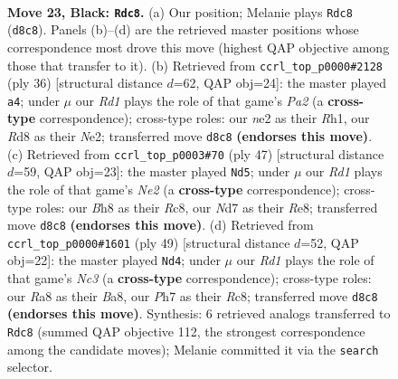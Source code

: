 \documentclass[11pt]{article}
\begin{document}
\clearpage

\begin{figure}[p]\centering
\begin{subfigure}{0.46\textwidth}\centering
\resizebox{\linewidth}{!}{%
\newchessgame
\chessboard[
  setfen={r2r1knb/p2n1p1p/P1p3p1/2P1p1B1/4P2P/5P2/4N1B1/R4RK1 b - - 2 23},
  showmover=false,
  pgfstyle=straightmove, color=movearrow, markmove={d8-c8}
]}
\caption{}
\end{subfigure}\hfill
\begin{subfigure}{0.46\textwidth}\centering
\resizebox{\linewidth}{!}{%
\newchessgame
\chessboard[
  setfen={2kr3r/2p2p1p/pp1b1p2/8/2b1P1PP/2P1BP2/P3NK2/R6R w - - 1 19},
  showmover=false,
  pgfstyle=straightmove, color=movearrow, markmove={a2-a4}
]}
\caption{}
\end{subfigure}
\\[4pt]
\begin{subfigure}{0.46\textwidth}\centering
\resizebox{\linewidth}{!}{%
\newchessgame
\chessboard[
  setfen={2r1r1k1/1pp1npp1/4p2p/pPB5/2R2P2/P3P3/6PP/2R3K1 b - - 4 24},
  showmover=false,
  pgfstyle=straightmove, color=movearrow, markmove={e7-d5}
]}
\caption{}
\end{subfigure}\hfill
\begin{subfigure}{0.46\textwidth}\centering
\resizebox{\linewidth}{!}{%
\newchessgame
\chessboard[
  setfen={b1r1r1k1/5ppp/1pn5/p1b2PPP/5B2/P1N2BK1/1P6/R6R b - - 8 25},
  showmover=false,
  pgfstyle=straightmove, color=movearrow, markmove={c6-d4}
]}
\caption{}
\end{subfigure}
\caption{\textbf{Move 23, Black: \texttt{Rdc8}.} (a) Our position; Melanie plays \texttt{Rdc8} (\texttt{d8c8}). Panels (b)--(d) are the retrieved master positions whose correspondence most drove this move (highest QAP objective among those that transfer to it). (b) Retrieved from \texttt{ccrl\_top\_p0000\#2128} (ply 36) [structural distance $d$=62, QAP obj=24]: the master played \texttt{a4}; under $\mu$ our \emph{Rd1} plays the role of that game's \emph{Pa2} (a \textbf{cross-type} correspondence); cross-type roles: our \emph{n}e2 as their \emph{R}h1, our \emph{R}d8 as their \emph{N}e2; transferred move \texttt{d8c8} \textbf{(endorses this move)}. (c) Retrieved from \texttt{ccrl\_top\_p0003\#70} (ply 47) [structural distance $d$=59, QAP obj=23]: the master played \texttt{Nd5}; under $\mu$ our \emph{Rd1} plays the role of that game's \emph{Ne2} (a \textbf{cross-type} correspondence); cross-type roles: our \emph{B}h8 as their \emph{R}c8, our \emph{N}d7 as their \emph{R}e8; transferred move \texttt{d8c8} \textbf{(endorses this move)}. (d) Retrieved from \texttt{ccrl\_top\_p0000\#1601} (ply 49) [structural distance $d$=52, QAP obj=22]: the master played \texttt{Nd4}; under $\mu$ our \emph{Rd1} plays the role of that game's \emph{Nc3} (a \textbf{cross-type} correspondence); cross-type roles: our \emph{R}a8 as their \emph{B}a8, our \emph{P}h7 as their \emph{R}c8; transferred move \texttt{d8c8} \textbf{(endorses this move)}. Synthesis: 6 retrieved analogs transferred to \texttt{Rdc8} (summed QAP objective 112, the strongest correspondence among the candidate moves); Melanie committed it via the \texttt{search} selector.}
\label{fig:thought-m45}
\end{figure}
\end{document}
